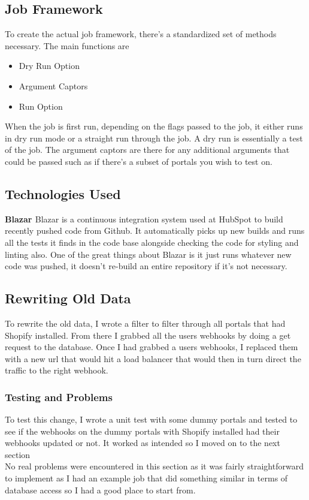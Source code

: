 \subsection{Job Framework}
To create the actual job framework, there's a standardized set of methods necessary. The main functions are \begin{itemize}
\item Dry Run Option
\item Argument Captors
\item Run Option
\end{itemize}

When the job is first run, depending on the flags passed to the job, it either runs in dry run mode or a straight run through the job. A dry run is essentially a test of the job. The argument captors are there for any additional arguments that could be passed such as if there's a subset of portals you wish to test on. 

\subsection{Technologies Used}
\textbf{Blazar \cite{blazar-docs}} \newline Blazar is a continuous integration system used at HubSpot to build recently pushed code from Github. It automatically picks up new builds and runs all the tests it finds in the code base alongside checking the code for styling and linting also. One of the great things about Blazar is it just runs whatever new code was pushed, it doesn't re-build an entire repository if it's not necessary. 
\subsection{Rewriting Old Data}
To rewrite the old data, I wrote a filter to filter through all portals that had Shopify installed. From there I grabbed all the users webhooks by doing a get request to the database. Once I had grabbed a users webhooks, I replaced them with a new url that would hit a load balancer that would then in turn direct the traffic to the right webhook. 

\subsubsection{Testing and Problems}
To test this change, I wrote a unit test with some dummy portals and tested to see if the webhooks on the dummy portals with Shopify installed had their webhooks updated or not. It worked as intended so I moved on to the next section \newline \\ No real problems were encountered in this section as it was fairly straightforward to implement as I had an example job that did something similar in terms of database access so I had a good place to start from.

